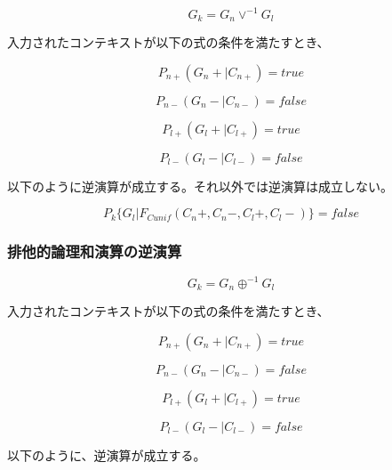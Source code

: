 \documentclass[12pt]{article}
\begin{document}
\begin{equation} G_k =G_n \vee^{-1} G_l\end{equation}

入力されたコンテキストが以下の式の条件を満たすとき、

\begin{equation} P_{n+}(G_n+|C_{n+}) = true\end{equation}

\begin{equation} P_{n-}(G_n-|C_{n-})=false \end{equation}

\begin{equation} P_{l+}(G_l+|C_{l+}) = true \end{equation}

\begin{equation} P_{l-}(G_l-|C_{l-}) = false \end{equation}

以下のように逆演算が成立する。それ以外では逆演算は成立しない。

\begin{equation} P_k\{G_l|F_{Cunif}(C_n+,C_n-,C_l+,C_l-)\}=false\end{equation}

\subsubsection{排他的論理和演算の逆演算}\label{ux6392ux4ed6ux7684ux8ad6ux7406ux548cux6f14ux7b97ux306eux9006ux6f14ux7b97}

\begin{equation} G_k =G_n \oplus^{-1} G_l\end{equation}

入力されたコンテキストが以下の式の条件を満たすとき、

\begin{equation} P_{n+}(G_n+|C_{n+})=true\end{equation}

\begin{equation} P_{n-}(G_n-|C_{n-})=false\end{equation}

\begin{equation} P_{l+}(G_l+|C_{l+})=true \end{equation}

\begin{equation} P_{l-}(G_l-|C_{l-}) = false \end{equation}

以下のように、逆演算が成立する。
\end{document}
